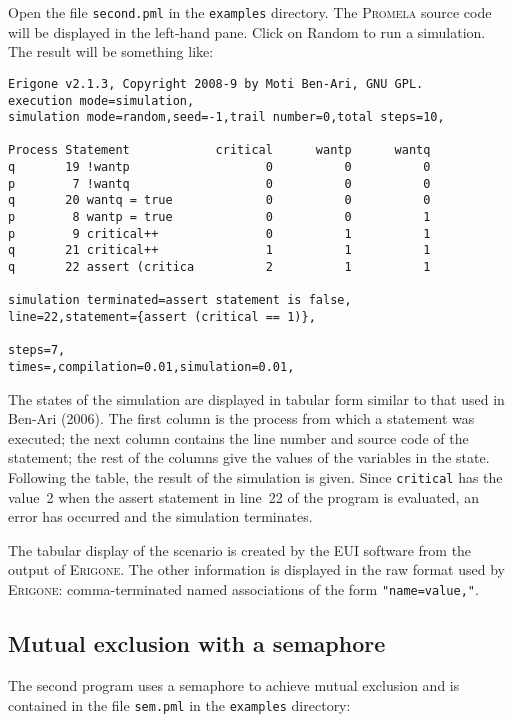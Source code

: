\documentclass[11pt]{article}
\newcommand*{\prg}{\textsc{Erigone}}
\newcommand*{\eui}{\textsc{EUI}}
\newcommand*{\prm}{\textsc{Promela}}
\newcommand*{\p}[1]{\texttt{#1}}
\newcommand*{\bu}[1]{\textsf{#1}}
\begin{document}
Open the file \p{second.pml} in the \p{examples} directory. The \prm{}
source code will be displayed in the left-hand pane. Click on
\bu{Random} to run a simulation. The result will be something like:

\pagebreak[4]

\begin{verbatim}
Erigone v2.1.3, Copyright 2008-9 by Moti Ben-Ari, GNU GPL.
execution mode=simulation,
simulation mode=random,seed=-1,trail number=0,total steps=10,

Process Statement            critical      wantp      wantq 
q       19 !wantp                   0          0          0 
p        7 !wantq                   0          0          0 
q       20 wantq = true             0          0          0 
p        8 wantp = true             0          0          1 
p        9 critical++               0          1          1 
q       21 critical++               1          1          1 
q       22 assert (critica          2          1          1 

simulation terminated=assert statement is false,
line=22,statement={assert (critical == 1)},

steps=7,
times=,compilation=0.01,simulation=0.01,
\end{verbatim}

The states of the simulation are displayed in tabular form similar to
that used in Ben-Ari (2006). The first column is the process from which
a statement was executed; the next column contains the line number and
source code of the statement; the rest of the columns give the values of
the variables in the state. Following the table, the result of the
simulation is given. Since \p{critical} has the value~2 when the assert
statement in line~22 of the program is evaluated, an error has occurred
and the simulation terminates.

The tabular display of the scenario is created by the \eui{} software
from the output of \prg{}. The other information is displayed in the raw
format used by \prg{}: comma-terminated named associations of the form
\p{"name=value,"}.

\subsection*{Mutual exclusion with a semaphore}

The second program uses a semaphore to achieve mutual exclusion
and is contained in the file \p{sem.pml} in the \p{examples} directory:
\end{document}
